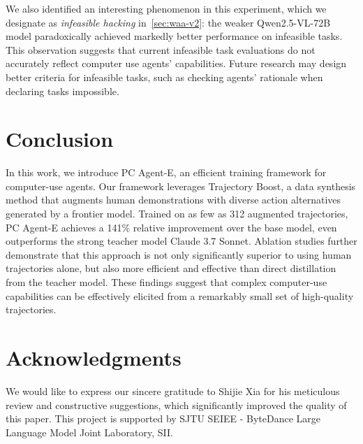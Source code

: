 \documentclass{article} %
\begin{document}
We also identified an interesting phenomenon in this experiment, which we designate as \textit{infeasible hacking} in~\autoref{sec:waa-v2}: the weaker Qwen2.5-VL-72B model paradoxically achieved markedly better performance on infeasible tasks. This observation suggests that current infeasible task evaluations do not accurately reflect computer use agents' capabilities. Future research may design better criteria for infeasible tasks, such as checking agents' rationale when declaring tasks impossible.

\section{Conclusion}
In this work, we introduce PC Agent-E, an efficient training framework for computer-use agents. Our framework leverages Trajectory Boost, a data synthesis method that augments human demonstrations with diverse action alternatives generated by a frontier model. Trained on as few as 312 augmented trajectories, PC Agent-E achieves a 141\% relative improvement over the base model, even outperforms the strong teacher model Claude 3.7 Sonnet. Ablation studies further demonstrate that this approach is not only significantly superior to using human trajectories alone, but also more efficient and effective than direct distillation from the teacher model. These findings suggest that complex computer-use capabilities can be effectively elicited from a remarkably small set of high-quality trajectories.


\section*{Acknowledgments}

We would like to express our sincere gratitude to Shijie Xia for his meticulous review and constructive suggestions, which significantly improved the quality of this paper. This project is supported by SJTU SEIEE - ByteDance Large Language Model Joint Laboratory, SII.


\end{document}
